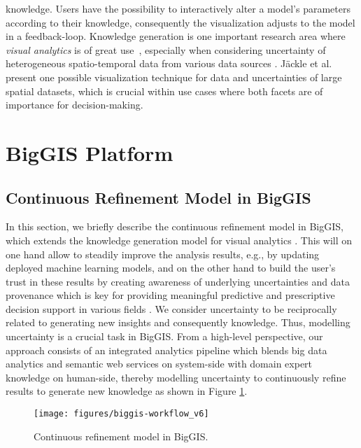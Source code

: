 \documentclass{sig-alternate-05-2015}
\begin{document}
knowledge. Users have the possibility to interactively alter a model's
parameters according to their knowledge, consequently the visualization adjusts
to the model in a feedback-loop. Knowledge generation is one important research
area where \textit{visual analytics} is of great use~\cite{Keim2008, Keim2010},
especially when considering uncertainty of heterogeneous spatio-temporal data
from various data sources \cite{SSK+16a}. J\"ackle et al. present one possible
visualization technique \cite{JSBK15} for data and uncertainties of large
spatial datasets, which is crucial within use cases where both facets are of
importance for decision-making.

\section{B\MakeLowercase{ig}GIS Platform}
\label{sec:biggis}

\subsection{Continuous Refinement Model in BigGIS}
\label{sec:crm}
In this section, we briefly describe the continuous refinement model in
BigGIS, which extends the knowledge generation model for visual
analytics \cite{SSS+14a}. This will on one hand allow to steadily
improve the analysis results, e.g., by updating deployed machine learning
models, and on the other hand to build the user's trust in these results by
creating awareness of underlying uncertainties and data provenance which is key
for providing meaningful predictive and prescriptive decision support in
various fields \cite{SSK+16a}. We consider uncertainty to be reciprocally
related to generating new insights and consequently knowledge. Thus, modelling
uncertainty is a crucial task in BigGIS. From a high-level perspective, our
approach consists of an integrated analytics pipeline which blends big data
analytics and semantic web services on system-side with domain expert
knowledge on human-side, thereby modelling uncertainty to continuously refine
results to generate new knowledge as shown in Figure \ref{fig:biggisworkflow}.

\begin{figure}
\centering
	\texttt{[image: figures/biggis-workflow\_v6]}
	\caption{Continuous refinement model in BigGIS.}
	\label{fig:biggisworkflow}
\end{figure}
\end{document}
